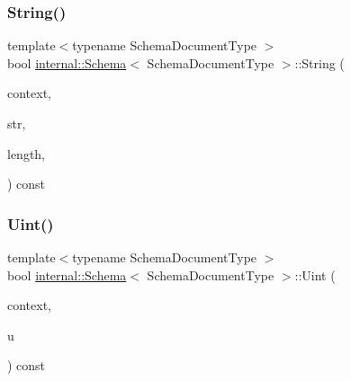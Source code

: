 \mbox{\label{classinternal_1_1Schema_a8e652cbc67fa34181c3fd813c38d5280}} 
\subsubsection{\texorpdfstring{String()}{String()}}
{\footnotesize\ttfamily template$<$typename Schema\+Document\+Type $>$ \\
bool \hyperlink{classinternal_1_1Schema}{internal\+::\+Schema}$<$ Schema\+Document\+Type $>$\+::String (\begin{DoxyParamCaption}\item[{\hyperlink{classinternal_1_1Schema_ac3f54abfefe300c5610c1205869cfd66}{Context} \&}]{context,  }\item[{const \hyperlink{classinternal_1_1Schema_a98043fca39adbf8b42e7472e3d80d6fa}{Ch} $\ast$}]{str,  }\item[{\hyperlink{rapidjson_8h_a5ed6e6e67250fadbd041127e6386dcb5}{Size\+Type}}]{length,  }\item[{bool}]{ }\end{DoxyParamCaption}) const\hspace{0.3cm}{\ttfamily [inline]}}

\mbox{\label{classinternal_1_1Schema_abd42af9c38c9a02cda760567751fb00f}} 
\subsubsection{\texorpdfstring{Uint()}{Uint()}}
{\footnotesize\ttfamily template$<$typename Schema\+Document\+Type $>$ \\
bool \hyperlink{classinternal_1_1Schema}{internal\+::\+Schema}$<$ Schema\+Document\+Type $>$\+::Uint (\begin{DoxyParamCaption}\item[{\hyperlink{classinternal_1_1Schema_ac3f54abfefe300c5610c1205869cfd66}{Context} \&}]{context,  }\item[{unsigned}]{u }\end{DoxyParamCaption}) const\hspace{0.3cm}{\ttfamily [inline]}}

\mbox{\label{classinternal_1_1Schema_a1f80b1a9502b71530a98694e7b54987d}} 

